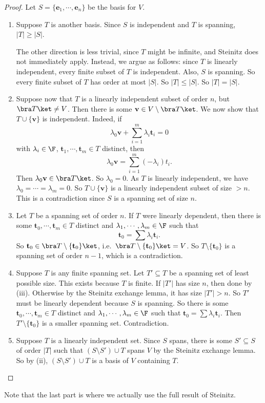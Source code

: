 \documentclass[a4paper]{article}
\begin{document}
\begin{proof}
  Let $S = \{\mathbf{e}_1, \cdots, \mathbf{e}_n\}$ be the basis for $V$.
  \begin{enumerate}
    \item Suppose $T$ is another basis. Since $S$ is independent and $T$ is spanning, $|T| \geq |S|$.

      The other direction is less trivial, since $T$ might be infinite, and Steinitz does not immediately apply. Instead, we argue as follows: since $T$ is linearly independent, every finite subset of $T$ is independent. Also, $S$ is spanning. So every finite subset of $T$ has order at most $|S|$. So $|T| \leq |S|$. So $|T| = |S|$.

    \item Suppose now that $T$ is a linearly independent subset of order $n$, but $\bra T\ket \not= V$. Then there is some $\mathbf{v} \in V\setminus \bra T\ket$. We now show that $T\cup \{\mathbf{v}\}$ is independent. Indeed, if
      \[
        \lambda_0 \mathbf{v} + \sum_{i = 1}^m \lambda_i \mathbf{t}_i = 0
      \]
      with $\lambda_i \in \F$, $\mathbf{t}_1, \cdots, \mathbf{t}_m\in T$ distinct, then
      \[
        \lambda_0 \mathbf{v} = \sum_{i = 1}^m (-\lambda_i) t_i.
      \]
      Then $\lambda_0 \mathbf{v} \in \bra T\ket$. So $\lambda_0= 0$. As $T$ is linearly independent, we have $\lambda_0 = \cdots = \lambda_m = 0$. So $T\cup \{\mathbf{v}\}$ is a linearly independent subset of size $> n$. This is a contradiction since $S$ is a spanning set of size $n$.

    \item Let $T$ be a spanning set of order $n$. If $T$ were linearly dependent, then there is some $\mathbf{t}_0, \cdots, \mathbf{t}_m \in T$ distinct and $\lambda_1, \cdots, \lambda_m \in \F$ such that
      \[
        \mathbf{t}_0 = \sum \lambda_i \mathbf{t}_i.
      \]
      So $\mathbf{t}_0 \in \bra T\setminus \{\mathbf{t}_0\}\ket$, i.e.\ $\bra T\setminus \{\mathbf{t}_0\} \ket = V$. So $T\setminus \{\mathbf{t}_0\}$ is a spanning set of order $n - 1$, which is a contradiction.

    \item Suppose $T$ is any finite spanning set. Let $T' \subseteq T$ be a spanning set of least possible size. This exists because $T$ is finite. If $|T'|$ has size $n$, then done by (iii). Otherwise by the Steinitz exchange lemma, it has size $|T'| > n$. So $T'$ must be linearly dependent because $S$ is spanning. So there is some $\mathbf{t}_0, \cdots, \mathbf{t}_m \in T$ distinct and $\lambda_1, \cdots, \lambda_m \in \F$ such that $\mathbf{t}_0 = \sum \lambda_i \mathbf{t}_i$. Then $T'\setminus \{\mathbf{t}_0\}$ is a smaller spanning set. Contradiction.

    \item Suppose $T$ is a linearly independent set. Since $S$ spans, there is some $S' \subseteq S$ of order $|T|$ such that $(S\setminus S')\cup T$ spans $V$ by the Steinitz exchange lemma. So by (ii), $(S\setminus S')\cup T$ is a basis of $V$ containing $T$.
  \end{enumerate}
\end{proof}
Note that the last part is where we actually use the full result of Steinitz.
\end{document}
